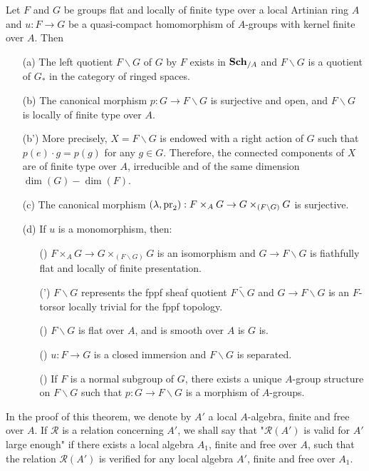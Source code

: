 \begin{theorem}\label{scheme alg group group quotient exists}
Let $F$ and $G$ be groups flat and locally of finite type over a local Artinian ring $A$ and $u:F\to G$ be a quasi-compact homomorphism of $A$-groups with kernel finite over $A$. Then
\begin{enumerate}
    \item[(a)] The left quotient $F\backslash G$ of $G$ by $F$ exists in $\mathbf{Sch}_{/A}$ and $F\backslash G$ is a quotient of $G_*$ in the category of ringed spaces.
    \item[(b)] The canonical morphism $p:G\to F\backslash G$ is surjective and open, and $F\backslash G$ is locally of finite type over $A$.
    \item[(b')] More precisely, $X=F\backslash G$ is endowed with a right action of $G$ such that $p(e)\cdot g=p(g)$ for any $g\in G$. Therefore, the connected components of $X$ are of finite type over $A$, irreducible and of the same dimension $\dim(G)-\dim(F)$.
    \item[(c)] The canonical morphism $(\lambda,\mathrm{pr}_2):F\times_AG\to G\times_{(F\backslash G)}G$ is surjective.
    \item[(d)] If $u$ is a monomorphism, then:
    \begin{enumerate}
        \item[(\rmnum{1})] $F\times_AG\to G\times_{(F\backslash G)}G$ is an isomorphism and $G\to F\backslash G$ is fiathfully flat and locally of finite presentation.
        \item[(\rmnum{1}')] $F\backslash G$ represents the fppf sheaf quotient $\widetilde{F\backslash G}$ and $G\to F\backslash G$ is an $F$-torsor locally trivial for the fppf topology.
        \item[(\rmnum{2})] $F\backslash G$ is flat over $A$, and is smooth over $A$ is $G$ is.
        \item[(\rmnum{3})] $u:F\to G$ is a closed immersion and $F\backslash G$ is separated.
        \item[(\rmnum{4})] If $F$ is a normal subgroup of $G$, there exists a unique $A$-group structure on $F\backslash G$ such that $p:G\to F\backslash G$ is a morphism of $A$-groups.    
    \end{enumerate}  
\end{enumerate}
\end{theorem}

In the proof of this theorem, we denote by $A'$ a local $A$-algebra, finite and free over $A$. If $\mathcal{R}$ is a relation concerning $A'$, we shall say that "$\mathcal{R}(A')$ is valid for $A'$ large enough" if there exists a local algebra $A_1$, finite and free over $A$, such that the relation $\mathcal{R}(A')$ is verified for any local algebra $A'$, finite and free over $A_1$. 

